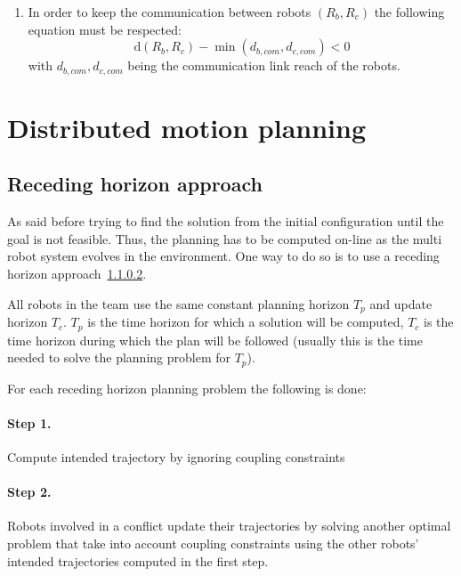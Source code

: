 \documentclass[eprint]{actapoly}
\begin{document}
\begin{enumerate}
    \item In order to keep the communication between robots $(R_b, R_c)$ the
    following equation must be respected: 
    \begin{equation}
    	\mathrm{d}(R_b,R_c)  - \min(d_{b,com}, d_{c,com}) < 0
    \end{equation}
    with $d_{b,com}, d_{c,com}$ being the communication link reach of the robots.
\end{enumerate}

\section{Distributed motion planning}

\subsection{Receding horizon approach}


As said before trying to find the solution from the initial configuration
until the goal is not feasible. Thus, the planning has to be computed on-line
as the multi robot system evolves in the environment.
One way to do so is to use a receding horizon approach~\ref{}.

All robots in the team use the same constant planning horizon $T_p$ and update
horizon $T_c$. $T_p$ is the time horizon for which a solution will be computed,
$T_c$ is the time horizon during which the plan will be followed (usually this
is the time needed to solve the planning problem for $T_p$).

For each receding horizon planning problem the following is done:
\paragraph{Step 1.} Compute intended trajectory by ignoring coupling constraints
\paragraph{Step 2.} Robots involved in a conflict update their trajectories
by solving another optimal problem that take into account coupling constraints
using the other robots' intended trajectories computed in the first step.
\end{document}
